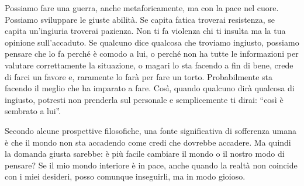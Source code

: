 \documentclass[12pt]{book} %
\begin{document}
Possiamo fare una guerra, anche metaforicamente, ma con la pace nel cuore. Possiamo sviluppare le giuste abilità. Se capita fatica troverai resistenza, se
capita un'ingiuria troverai pazienza. Non ti fa violenza chi ti insulta ma la tua opinione
sull'accaduto. Se qualcuno dice qualcosa che troviamo ingiusto, possiamo pensare che lo fa perché
è comodo a lui, o perché non ha tutte le informazioni per valutare correttamente la situazione, o magari lo sta facendo a fin di bene, crede di farci un favore e, raramente lo farà per fare un torto. Probabilmente sta facendo il meglio che ha imparato a fare. 
Così, quando qualcuno dirà qualcosa di ingiusto, potresti non prenderla sul personale e semplicemente ti dirai: “così è sembrato a lui”.

Secondo alcune prospettive filosofiche, una fonte significativa di sofferenza umana è che il mondo non sta accadendo come credi che dovrebbe accadere. Ma quindi la domanda giusta sarebbe: è più facile cambiare il mondo o il nostro modo di pensare? Se il mio mondo interiore è in pace, anche quando la realtà non coincide con i miei desideri, posso comunque inseguirli, ma in modo gioioso.
\end{document}
